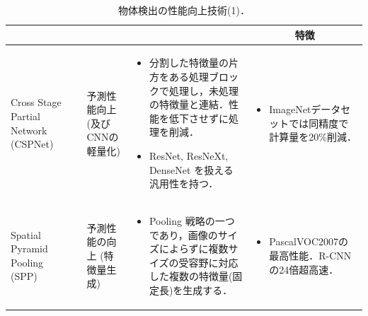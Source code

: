 \documentclass[twocolumn]{jsarticle} %
\begin{document}
\begin{table}
    \caption{物体検出の性能向上技術(1)．}
    \label{tbl-option1}
    \begin{center}
        \setlength{\tabcolsep}{3pt}
        \footnotesize
        \begin{tabularx}{\linewidth}{XcXp{7cm}X} \toprule
            \centering{技術名称} & \centering{文献} & \centering{用途} & \centering{概要} & \multicolumn{1}{c}{特徴} \\ \midrule

            Cross Stage Partial Network (CSPNet) 
            & \cite{WLWCHY20} & 予測性能向上 (及びCNNの軽量化) & 
            \begin{itemize}
                \vspace{-0.7\baselineskip}
                \setlength{\leftskip}{-3mm}
                \item 分割した特徴量の片方をある処理ブロックで処理し，未処理の特徴量と連結．性能を低下させずに処理を削減．
                \item ResNet, ResNeXt, DenseNet を扱える汎用性を持つ．
            \end{itemize}
            &
            \begin{itemize}
                \vspace{-0.7\baselineskip}
                \setlength{\leftskip}{-3mm}
                \item ImageNetデータセットでは同精度で計算量を20\%削減．
            \end{itemize}
            \\

            Spatial Pyramid Pooling (SPP)
            & \cite{HZRS15,HZRS14} & 予測性能の向上 (特徴量生成) & 
            \begin{itemize}
                \vspace{-0.7\baselineskip}
                \setlength{\leftskip}{-3mm}
                \item Pooling 戦略の一つであり，画像のサイズによらずに複数サイズの受容野に対応した複数の特徴量(固定長)を生成する．
            \end{itemize}
            &
            \begin{itemize}
                \vspace{-0.7\baselineskip}
                \setlength{\leftskip}{-3mm}
                \item PascalVOC2007の最高性能．R-CNNの24倍超高速．
            \end{itemize}
            \\


\end{tabularx}
\end{center}
\end{table}
\end{document}
